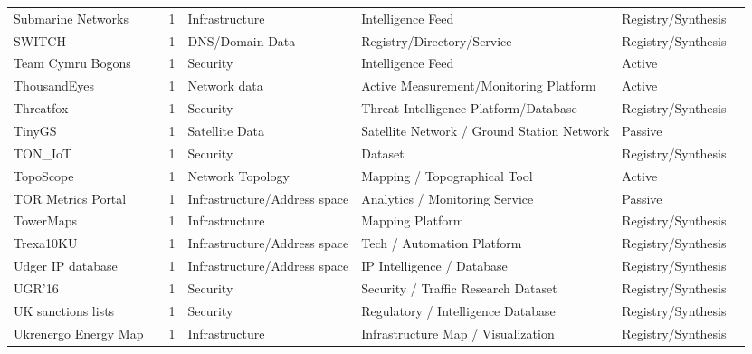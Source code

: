 \begin{table}[h!]
\begin{tabular}{lllllll}
Submarine Networks & \cite{submarinenet} & 1 & Infrastructure & Intelligence Feed & Registry/Synthesis & \cite{10.1145/3777912.3839834} \\
SWITCH & \cite{switch} & 1 & DNS/Domain Data & Registry/Directory/Service & Registry/Synthesis & \cite{10.1145/3618257.3624797} \\
Team Cymru Bogons & \cite{bogons} & 1 & Security & Intelligence Feed & Active & \cite{10.1007/978-3-032-18268-5_2} \\
ThousandEyes & \cite{thousandeyes} & 1 & Network data & Active Measurement/Monitoring Platform & Active & \cite{10.1007/978-3-031-85960-1_14} \\
Threatfox & \cite{threatfox} & 1 & Security & Threat Intelligence Platform/Database & Registry/Synthesis & \cite{10.1007/978-3-031-56249-5_9} \\
TinyGS & \cite{tinygs} & 1 & Satellite Data & Satellite Network / Ground Station Network & Passive & \cite{10.1145/3730567.3764496} \\
TON\_IoT & \cite{ton} & 1 & Security & Dataset & Registry/Synthesis & \cite{10.1145/3646547.3689011} \\
TopoScope & \cite{10.1145/3419394.3423627} & 1 & Network Topology & Mapping / Topographical Tool & Active & \cite{10.1145/3487552.3487825} \\
TOR Metrics Portal & \cite{tor} & 1 & Infrastructure/Address space & Analytics / Monitoring Service & Passive & \cite{10.1007/978-3-030-72582-2_28} \\
TowerMaps & \cite{towermaps} & 1 & Infrastructure & Mapping Platform & Registry/Synthesis & \cite{10.1007/978-3-031-85960-1_20} \\
Trexa10KU & \cite{10.1145/3366423.3380104} & 1 & Infrastructure/Address space & Tech / Automation Platform & Registry/Synthesis & \cite{10.1145/3517745.3561444} \\
Udger IP database & \cite{udger} & 1 & Infrastructure/Address space & IP Intelligence / Database & Registry/Synthesis & \cite{10.1145/3618257.3624797} \\
UGR'16 & \cite{ugr16} & 1 & Security & Security / Traffic Research Dataset & Registry/Synthesis & \cite{10.1145/3646547.3689011} \\
UK sanctions lists & \cite{uksanctions} & 1 & Security & Regulatory / Intelligence Database & Registry/Synthesis & \cite{10.1145/3517745.3561423} \\
Ukrenergo Energy Map & \cite{ukrenegro} & 1 & Infrastructure & Infrastructure Map / Visualization & Registry/Synthesis & \cite{10.1145/3730567.3764449} \\

\end{tabular}
\end{table}
